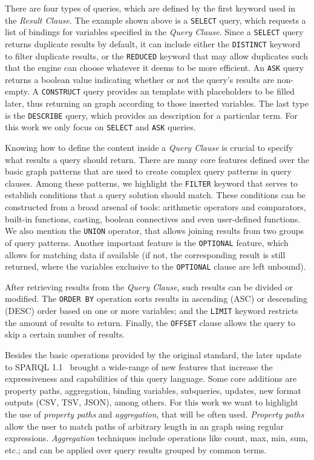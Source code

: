 There are four types of \SPARQL{} queries, which are defined by the first keyword used in the 
\textit{Result Clause}. The example shown above is a \texttt{SELECT} query, which requests a list 
of bindings for variables specified in the \textit{Query Clause}. Since a \texttt{SELECT} query 
returns duplicate results by default, it can include either the \texttt{DISTINCT} keyword to filter 
duplicate results, or the \texttt{REDUCED} keyword that may allow duplicates such that the engine 
can choose whatever it deems to be more efficient. An \texttt{ASK} query returns a boolean value 
indicating whether or not the query’s results are non-empty. A \texttt{CONSTRUCT} query provides 
an \RDF{} template with placeholders to be filled later, thus returning an \RDF{} graph according to 
those inserted variables. The last type is the \texttt{DESCRIBE} query, which provides an \RDF{} 
description for a particular \RDF{} term. For this work we only focus on \texttt{SELECT} and 
\texttt{ASK} queries.

Knowing how to define the content inside a \textit{Query Clause} is crucial to specify what results 
a \SPARQL{} query should return. There are many core features defined over the basic graph patterns 
that are used to create complex query patterns in query clauses. Among these patterns, we highlight 
the \texttt{FILTER} keyword that serves to establish conditions that a query solution should match. 
These conditions can be constructed from a broad arsenal of tools: arithmetic operators and 
comparators, built-in functions, casting, boolean connectives and even user-defined functions. 
We also mention the \texttt{UNION} operator, that allows joining results from two groups of query 
patterns. Another important feature is the \texttt{OPTIONAL} feature, which allows for matching 
data if available (if not, the corresponding result is still returned, where the variables 
exclusive to the \texttt{OPTIONAL} clause are left unbound).

After retrieving results from the \textit{Query Clause}, such results can be divided or modified. 
The \texttt{ORDER BY} operation sorts results in ascending (ASC) or descending (DESC) order based 
on one or more variables; and the \texttt{LIMIT} keyword restricts the amount of results to return. 
Finally, the \texttt{OFFSET} clause allows the query to skip a certain number of results.

Besides the basic operations provided by the original \SPARQL{} standard, the later update to 
SPARQL 1.1~\cite{key:sparql11} brought a wide-range of new features that increase the expressiveness 
and capabilities of this query language. Some core additions are property paths, aggregation, 
binding variables, subqueries, updates, new format outputs (CSV, TSV, JSON), among others. 
For this work we want to highlight the use of \textit{property paths} and \textit{aggregation}, 
that will be often used. \textit{Property paths} allow the user to match paths of arbitrary 
length in an \RDF{} graph using regular expressions. \textit{Aggregation} techniques include 
operations like count, max, min, sum, etc.; and can be applied over query results grouped 
by common terms.


